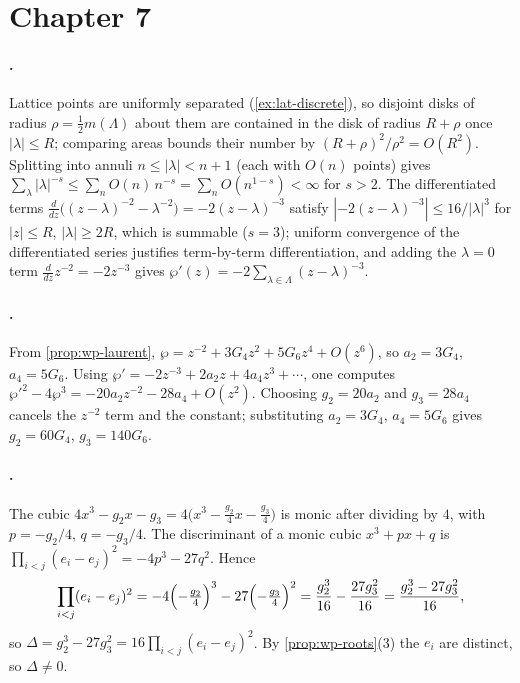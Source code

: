 \section{Chapter 7}
\label{sec:soln-ch7}

\paragraph{.}
Lattice points are uniformly separated (\cref{ex:lat-discrete}), so disjoint disks
of radius \(\rho = \tfrac12 m(\Lambda)\) about them are contained in the disk of
radius \(R + \rho\) once \(|\lambda| \le R\); comparing areas bounds their number
by \((R+\rho)^2/\rho^2 = O(R^2)\). Splitting into annuli \(n \le |\lambda| < n+1\)
(each with \(O(n)\) points) gives \(\sum_\lambda |\lambda|^{-s} \le \sum_n O(n)\,
n^{-s} = \sum_n O(n^{1-s}) < \infty\) for \(s > 2\). The differentiated terms
\(\frac{d}{dz}\bigl((z-\lambda)^{-2} - \lambda^{-2}\bigr) = -2(z-\lambda)^{-3}\)
satisfy \(|{-2}(z-\lambda)^{-3}| \le 16/|\lambda|^3\) for \(|z| \le R\),
\(|\lambda| \ge 2R\), which is summable (\(s = 3\)); uniform convergence of the
differentiated series justifies term-by-term differentiation, and adding the
\(\lambda = 0\) term \(\tfrac{d}{dz}z^{-2} = -2z^{-3}\) gives
\(\wp'(z) = -2\sum_{\lambda \in \Lambda}(z-\lambda)^{-3}\).

\paragraph{.}
From \cref{prop:wp-laurent}, \(\wp = z^{-2} + 3G_4 z^2 + 5G_6 z^4 + O(z^6)\), so
\(a_2 = 3G_4\), \(a_4 = 5G_6\). Using \(\wp' = -2z^{-3} + 2a_2 z + 4a_4 z^3 +
\cdots\), one computes \(\wp'^2 - 4\wp^3 = -20a_2 z^{-2} - 28 a_4 + O(z^2)\).
Choosing \(g_2 = 20 a_2\) and \(g_3 = 28 a_4\) cancels the \(z^{-2}\) term and the
constant; substituting \(a_2 = 3G_4\), \(a_4 = 5G_6\) gives \(g_2 = 60G_4\),
\(g_3 = 140 G_6\).

\paragraph{.}
The cubic \(4x^3 - g_2 x - g_3 = 4\bigl(x^3 - \tfrac{g_2}{4}x - \tfrac{g_3}{4}\bigr)\)
is monic after dividing by \(4\), with \(p = -g_2/4\), \(q = -g_3/4\). The
discriminant of a monic cubic \(x^3 + px + q\) is \(\prod_{i<j}(e_i-e_j)^2 =
-4p^3 - 27q^2\). Hence
\[
  \prod_{i<j}(e_i-e_j)^2 = -4\Bigl(-\tfrac{g_2}{4}\Bigr)^3 - 27\Bigl(-\tfrac{g_3}{4}\Bigr)^2
  = \frac{g_2^3}{16} - \frac{27 g_3^2}{16} = \frac{g_2^3 - 27g_3^2}{16},
\]
so \(\Delta = g_2^3 - 27g_3^2 = 16\prod_{i<j}(e_i-e_j)^2\). By
\cref{prop:wp-roots}(3) the \(e_i\) are distinct, so \(\Delta \ne 0\).

